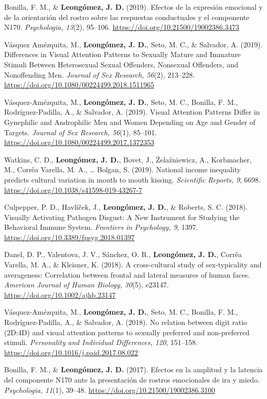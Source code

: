 \documentclass[11pt,a4paper,]{awesome-cv}
\begin{document}
Bonilla, F. M., \& \textbf{Leongómez, J. D.} (2019). Efectos de la
expresión emocional y de la orientación del rostro sobre las respuestas
conductuales y el componente N170. \emph{Psychologia, 13}(2), 95--106.
\url{https://doi.org/10.21500/19002386.3473}

Vásquez Amézquita, M., \textbf{Leongómez, J. D.}, Seto, M. C., \&
Salvador, A. (2019). Differences in Visual Attention Patterns to
Sexually Mature and Immature Stimuli Between Heterosexual Sexual
Offenders, Nonsexual Offenders, and Nonoffending Men. \emph{Journal of
Sex Research, 56}(2), 213--228.
\url{https://doi.org/10.1080/00224499.2018.1511965}

Vásquez-Amézquita, M., \textbf{Leongómez, J. D.}, Seto, M. C., Bonilla,
F. M., Rodríguez-Padilla, A., \& Salvador, A. (2019). Visual Attention
Patterns Differ in Gynephilic and Androphilic Men and Women Depending on
Age and Gender of Targets. \emph{Journal of Sex Research, 56}(1),
85--101. \url{https://doi.org/10.1080/00224499.2017.1372353}

Watkins, C. D., \textbf{Leongómez, J. D.}, Bovet, J., Żelaźniewicz, A.,
Korbmacher, M., Corrêa Varella, M. A., \ldots{} Bolgan, S. (2019).
National income inequality predicts cultural variation in mouth to mouth
kissing. \emph{Scientific Reports, 9}, 6698.
\url{https://doi.org/10.1038/s41598-019-43267-7}

Culpepper, P. D., Havlíček, J., \textbf{Leongómez, J. D.}, \& Roberts,
S. C. (2018). Visually Activating Pathogen Disgust: A New Instrument for
Studying the Behavioral Immune System. \emph{Frontiers in Psychology,
9}, 1397. \url{https://doi.org/10.3389/fpsyg.2018.01397}

Danel, D. P., Valentova, J. V., Sánchez, O. R.,
\textbf{Leongómez, J. D.}, Corrêa Varella, M. A., \& Kleisner, K.
(2018). A cross-cultural study of sex-typicality and averageness:
Correlation between frontal and lateral measures of human faces.
\emph{American Journal of Human Biology, 30}(5), e23147.
\url{https://doi.org/10.1002/ajhb.23147}

Vásquez-Amézquita, M., \textbf{Leongómez, J. D.}, Seto, M. C., Bonilla,
F. M., Rodríguez-Padilla, A., \& Salvador, A. (2018). No relation
between digit ratio (2D:4D) and visual attention patterns to sexually
preferred and non-preferred stimuli. \emph{Personality and Individual
Differences, 120}, 151--158.
\url{https://doi.org/10.1016/j.paid.2017.08.022}

Bonilla, F. M., \& \textbf{Leongómez, J. D.} (2017). Efectos en la
amplitud y la latencia del componente N170 ante la presentación de
rostros emocionales de ira y miedo. \emph{Psychologia, 11}(1), 39--48.
\url{https://doi.org/10.21500/19002386.3100}
\end{document}
